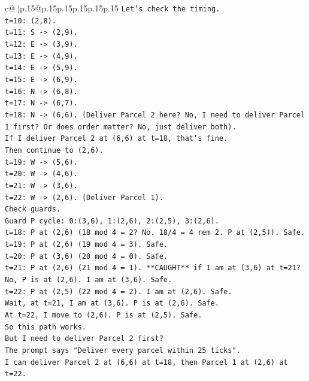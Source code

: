 \documentclass{article}
\begin{document}
{\begin{supertabular}{c@{$\;$}|p{.15\linewidth}@{}p{.15\linewidth}p{.15\linewidth}p{.15\linewidth}p{.15\linewidth}p{.15\linewidth}}
{{{\texttt{Let's check the timing.} \\
\texttt{t=10: (2,8).} \\
\texttt{t=11: S {-}> (2,9).} \\
\texttt{t=12: E {-}> (3,9).} \\
\texttt{t=13: E {-}> (4,9).} \\
\texttt{t=14: E {-}> (5,9).} \\
\texttt{t=15: E {-}> (6,9).} \\
\texttt{t=16: N {-}> (6,8).} \\
\texttt{t=17: N {-}> (6,7).} \\
\texttt{t=18: N {-}> (6,6). (Deliver Parcel 2 here? No, I need to deliver Parcel 1 first? Or does order matter? No, just deliver both).} \\
\texttt{If I deliver Parcel 2 at (6,6) at t=18, that's fine.} \\
\texttt{Then continue to (2,6).} \\
\texttt{t=19: W {-}> (5,6).} \\
\texttt{t=20: W {-}> (4,6).} \\
\texttt{t=21: W {-}> (3,6).} \\
\texttt{t=22: W {-}> (2,6). (Deliver Parcel 1).} \\
\texttt{Check guards.} \\
\texttt{Guard P cycle: 0:(3,6), 1:(2,6), 2:(2,5), 3:(2,6).} \\
\texttt{t=18: P at (2,6) (18 mod 4 = 2? No. 18/4 = 4 rem 2. P at (2,5)). Safe.} \\
\texttt{t=19: P at (2,6) (19 mod 4 = 3). Safe.} \\
\texttt{t=20: P at (3,6) (20 mod 4 = 0). Safe.} \\
\texttt{t=21: P at (2,6) (21 mod 4 = 1). **CAUGHT** if I am at (3,6) at t=21? No, P is at (2,6). I am at (3,6). Safe.} \\
\texttt{t=22: P at (2,5) (22 mod 4 = 2). I am at (2,6). Safe.} \\
\texttt{Wait, at t=21, I am at (3,6). P is at (2,6). Safe.} \\
\texttt{At t=22, I move to (2,6). P is at (2,5). Safe.} \\
\texttt{So this path works.} \\
\texttt{But I need to deliver Parcel 2 first?} \\
\texttt{The prompt says "Deliver every parcel within 25 ticks".} \\
\texttt{I can deliver Parcel 2 at (6,6) at t=18, then Parcel 1 at (2,6) at t=22.} \\
}}}
\end{supertabular}}
\end{document}
